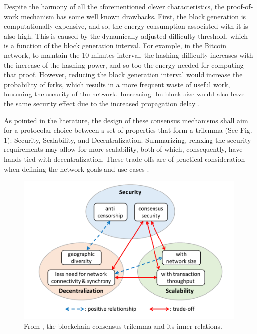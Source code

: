 \documentclass[journal]{IEEEtran}
\begin{document}
Despite the harmony of all the aforementioned clever characteristics,
the proof-of-work mechanism has some well known drawbacks. 
First, the block generation is computationally expensive, and so, the
energy consumption associated with it is also high. This is caused by the
dynamically adjusted difficulty threshold, which is a function of the block 
generation interval. For example, in the Bitcoin network, to maintain the 10 
minutes interval, the hashing difficulty
increases with the increase of the hashing power, and so too the energy needed for computing that proof. 
However, reducing the block generation interval would increase the
probability of forks, which results in a more frequent waste of useful work,
loosening the security of the network. Increasing the block size would also
have the same security effect due to the increased propagation delay \cite{8629877, natoli2019deconstructing}.

As pointed in the literature, the design of these consensus mechanisms
shall aim for a protocolar choice between a set of properties that form a trilemma (See Fig. \ref{fig:trilemma}): 
Security, Scalability, and Decentralization.
Summarizing, relaxing the security requirements may allow for more scalability, both of which,
consequently, have hands tied with decentralization. These trade-offs are of practical
consideration when defining the network goals and use cases \cite{survey-dist-consensus}.

\begin{figure}[h]
  \centering
  \includegraphics[width=\columnwidth]{trilemma}
  \caption{From \cite{survey-dist-consensus}, the blockchain consensus trilemma and its inner relations.}
  \label{fig:trilemma}
\end{figure}
\end{document}
